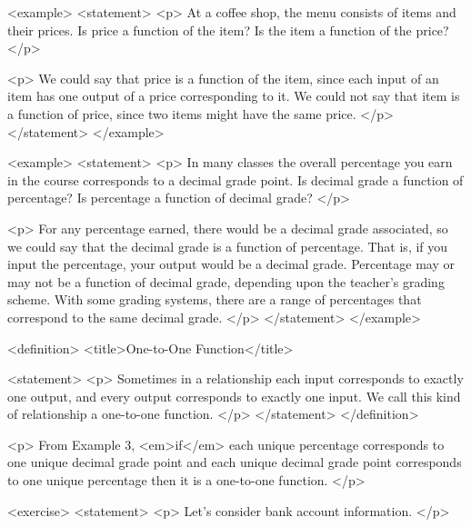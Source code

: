         <example>
            <statement>
                <p>
                    At a coffee shop, the menu consists of items and their prices.
                    Is price a function of the item? Is the item a function of the price?
                </p>

                <p>
                    We could say that price is a function of the item, since each input of an item has one output of a price corresponding to it.
                    We could not say that item is a function of price, since two items might have the same price.
                </p>
            </statement>
        </example>

        <example>
            <statement>
                <p>
                    In many classes the overall percentage you earn in the course corresponds to a decimal grade point.
                    Is decimal grade a function of percentage? Is percentage a function of decimal grade?
                </p>

                <p>
                    For any percentage earned, there would be a decimal grade associated, so we could say that the decimal grade is a function of percentage.
                    That is, if you input the percentage, your output would be a decimal grade.
                    Percentage may or may not be a function of decimal grade, depending upon the teacher’s grading scheme.
                    With some grading systems, there are a range of percentages that correspond to the same decimal grade.
                </p>
            </statement>
        </example>

        <definition>
            <title>One-to-One Function</title>

            <statement>
                <p>
                    Sometimes in a relationship each input corresponds to exactly one output, and every output corresponds to exactly one input.
                    We call this kind of relationship a one-to-one function.
                </p>
            </statement>
        </definition>

        <p>
            From Example 3, <em>if</em> each unique percentage corresponds to one unique decimal grade point and each unique decimal grade point corresponds to one unique percentage then it is a one-to-one function.
        </p>

        <exercise>
            <statement>
                <p>
                    Let’s consider bank account information.
                </p>

